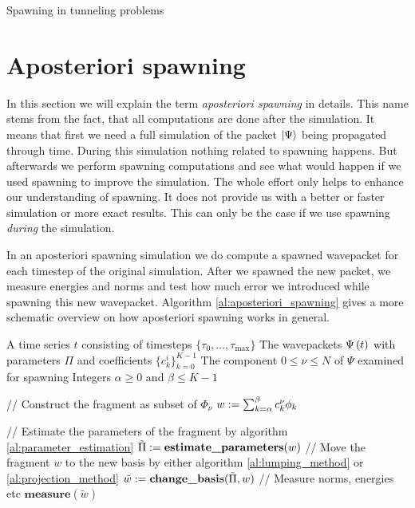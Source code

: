 \begin{chapter}{Spawning in tunneling problems}
\section{Aposteriori spawning}

In this section we will explain the term \emph{aposteriori spawning} in details.
This name stems from the fact, that all computations are done after the simulation.
It means that first we need a full simulation of the packet $\Ket{\Psi}$ being
propagated through time. During this simulation nothing related to spawning
happens. But afterwards we perform spawning computations and see what would happen
if we used spawning to improve the simulation. The whole effort only helps to
enhance our understanding of spawning. It does not provide us with a better
or faster simulation or more exact results. This can only be the case if we
use spawning \emph{during} the simulation.

In an aposteriori spawning simulation we do compute a spawned wavepacket for
each timestep of the original simulation. After we spawned the new packet,
we measure energies and norms and test how much error we introduced while spawning
this new wavepacket. Algorithm \ref{al:aposteriori_spawning} gives a more schematic
overview on how aposteriori spawning works in general.

\begin{algorithm}
\caption{Aposteriori spawning method (in general)}
\label{al:aposteriori_spawning}
\begin{algorithmic}
  \REQUIRE A time series $t$ consisting of timesteps $\{\tau_0, \ldots, \tau_{\text{max}}\}$
  \REQUIRE The wavepackets $\Psi\left( t \right)$ with parameters $\Pi$ and coefficients $\{c^i_k\}_{k=0}^{K-1}$
  \REQUIRE The component $0 \leq \nu \leq N$ of $\Psi$ examined for spawning 
  \REQUIRE Integers $\alpha \geq 0$ and $\beta \leq K-1$

    \STATE // Construct the fragment as subset of $\Phi_\nu$
    \STATE $w := \sum_{k=\alpha}^{\beta} c_k^\nu \phi_k$
  
    \STATE // Estimate the parameters of the fragment by algorithm \ref{al:parameter_estimation}
    \STATE $\tilde{\Pi} := \textbf{estimate\_parameters}(w)$
    \STATE // Move the fragment $w$ to the new basis by either algorithm \ref{al:lumping_method} or \ref{al:projection_method}
    \STATE $\tilde{w} := \textbf{change\_basis}(\tilde{\Pi}, w)$
    \STATE // Measure norms, energies etc
    \STATE $\textbf{measure}(\tilde{w})$
  \ENDFOR
\end{algorithmic}
\end{algorithm}


\end{chapter}
